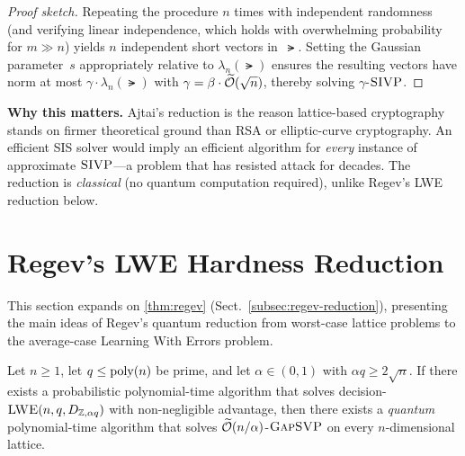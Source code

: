 \begin{proof}[Proof sketch]
Repeating the procedure $n$ times with independent randomness
(and verifying linear independence, which holds with
overwhelming probability for $m \gg n$) yields $n$
independent short vectors in~$\lat$.  Setting the Gaussian
parameter~$s$ appropriately relative to $\lambda_n(\lat)$
ensures the resulting vectors have norm at most
$\gamma \cdot \lambda_n(\lat)$ with
$\gamma = \beta \cdot \widetilde{\mathcal{O}}(\sqrt{n})$, thereby
solving $\gamma$-$\textsc{SIVP}$.
\end{proof}

\begin{svgraybox}
\textbf{Why this matters.}
Ajtai's reduction is the reason lattice-based cryptography
stands on firmer theoretical ground than RSA or elliptic-curve
cryptography.  An efficient SIS solver would imply an
efficient algorithm for \emph{every} instance of approximate
$\textsc{SIVP}$---a problem that has resisted attack for decades.
The reduction is \emph{classical} (no quantum computation
required), unlike Regev's LWE reduction below.
\end{svgraybox}


\section{Regev's LWE Hardness Reduction}
\label{app:regev-reduction}

This section expands on \cref{thm:regev}
(Sect.~\ref{subsec:regev-reduction}), presenting the main ideas
of Regev's quantum reduction from worst-case lattice problems
to the average-case Learning With Errors problem.

\begin{theorem}
\label{thm:regev-app}
Let $n \geq 1$, let $q \leq \operatorname{poly}(n)$ be prime, and let
$\alpha \in (0,1)$ with $\alpha q \geq 2\sqrt{n}$.  If there
exists a probabilistic polynomial-time algorithm that solves
decision-$\textsc{LWE}(n, q, D_{\mathbb{Z}, \alpha q})$ with non-negligible
advantage, then there exists a \emph{quantum}
polynomial-time algorithm that solves
$\widetilde{\mathcal{O}}(n/\alpha)$-$\textsc{GapSVP}$ on every
$n$-dimensional lattice.
\end{theorem}

